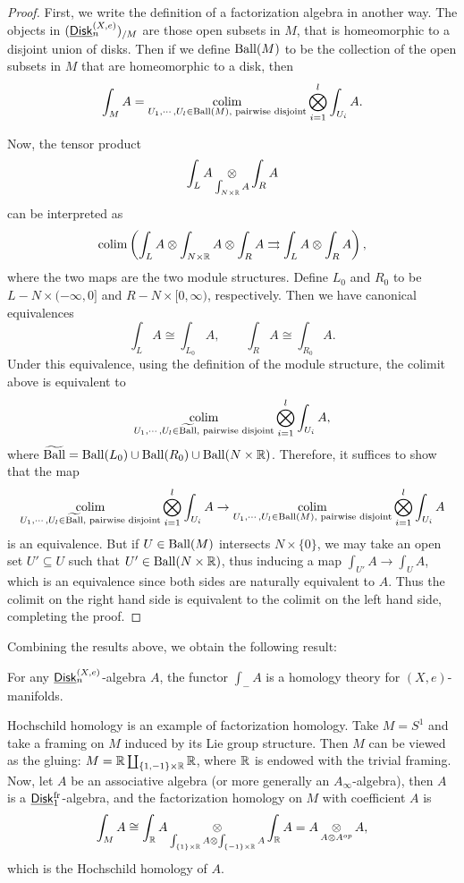 \documentclass[twoside]{article}
\begin{document}
\begin{proof}
    First, we write the definition of a factorization algebra in another way. The
    objects in $(\underline{\smash{\mathsf{Disk}}}_n^{(X,e)})_{/M}$ are those open subsets in $M$, that is
    homeomorphic to a disjoint union of disks. Then if we define $\mathrm{Ball}(M)$
    to be the collection of the open subsets in $M$ that are homeomorphic to a disk, then $$\int_MA
    =\mathop{\operatorname{colim}}_{U_1,\cdots,U_l\in\mathrm{Ball}(M),\text{ pairwise disjoint}}\bigotimes\limits_{i=1}^l
    \int_{U_i}A.$$

    Now, the tensor product $$\int_LA\mathop{\operatorname{\otimes}}\limits_{\int_{N\times\mathbb{R}}A}\int_RA$$ can be
    interpreted as $$\mathop{\operatorname{colim}}\left(\int_LA\otimes\int_{N\times\mathbb{R}}A\otimes\int_RA\rightrightarrows
    \int_LA\otimes\int_RA\right),$$ where the two maps are the two module structures. 
    Define $L_0$ and $R_0$ to be $L-N\times(-\infty,0]$ and $R-N\times[0,\infty)$,
    respectively. Then we have canonical equivalences $$\int_LA\cong\int_{L_0}A,
    \qquad\int_RA\cong\int_{R_0}A.$$ Under this equivalence, using
    the definition of the module structure, the colimit above is equivalent to
    $$\mathop{\operatorname{colim}}_{U_1,\cdots,U_l\in\widetilde{\mathrm{Ball}},\text{ pairwise disjoint}}
    \bigotimes\limits_{i=1}^l\int_{U_i}A,$$ where $\widetilde{\mathrm{Ball}}=\mathrm{Ball}(L_0)\cup\mathrm{Ball}(R_0)
    \cup\mathrm{Ball}(N\times\mathbb{R})$. Therefore, it suffices to show that the map
    $$\mathop{\operatorname{colim}}_{U_1,\cdots,U_l\in\widetilde{\mathrm{Ball}},\text{ pairwise disjoint}}
    \bigotimes\limits_{i=1}^l\int_{U_i}A\to\mathop{\operatorname{colim}}_{U_1,\cdots,U_l\in\mathrm{Ball}(M),
    \text{ pairwise disjoint}}\bigotimes\limits_{i=1}^l\int_{U_i}A$$ is an equivalence.
    But if $U\in\mathrm{Ball}(M)$ intersects $N\times\{0\}$, we may take
    an open set $U'\subseteq U$ such that $U'\in\mathrm{Ball}(N\times\mathbb{R})$, thus inducing
    a map $\int_{U'}A\to\int_UA$, which is an equivalence since both sides
    are naturally equivalent to $A$. Thus the colimit on the right hand side 
    is equivalent to the colimit on the left hand side, completing the proof.
\end{proof}

Combining the results above, we obtain the following result:

\begin{proposition}
    For any $\underline{\smash{\mathsf{Disk}}}_n^{(X,e)}$-algebra $A$, the functor $\int_- A$ is a
    homology theory for $(X,e)$-manifolds.
\end{proposition}

\begin{example}
    Hochschild homology is an example of factorization homology.
    Take $M=S^1$ and take a framing on $M$ induced by its Lie group structure. 
    Then $M$ can be viewed as the gluing: $M=\mathbb{R}\coprod_{\{1,-1\}\times\mathbb{R}}\mathbb{R}$,
    where $\mathbb{R}$ is endowed with the trivial framing. Now, let $A$ be an associative
    algebra (or more generally an $A_\infty$-algebra), then $A$ is a
    $\underline{\smash{\mathsf{Disk}}}_1^{\mathrm{fr}}$-algebra, and the factorization homology on $M$ with coefficient
    $A$ is $$\int_MA\cong\int_{\mathbb{R}}A\mathop{\operatorname{\otimes}}\limits_{\int_{\{1\}\times\mathbb{R}}A\otimes\int
    _{\{-1\}\times\mathbb{R}}A}\int_{\mathbb{R}}A=A\mathop{\operatorname{\otimes}}\limits_{A\otimes A^{op}}A,$$ which is the 
    Hochschild homology of $A$.
\end{example}
\end{document}
